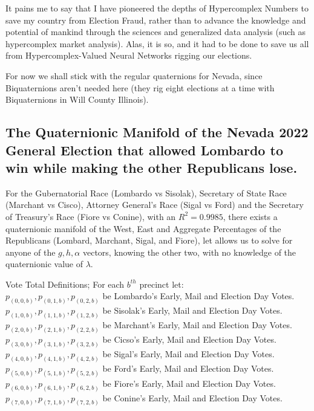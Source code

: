 It pains me to say that I have pioneered the depths of Hypercomplex Numbers to save my country from Election Fraud, rather than to advance the knowledge and potential of mankind through the sciences and generalized data analysis (such as hypercomplex market analysis). Alas, it is so, and it had to be done to save us all from Hypercomplex-Valued Neural Networks rigging our elections.

For now we shall stick with the regular quaternions for Nevada, since Biquaternions aren't needed here (they rig eight elections at a time with Biquaternions in Will County Illinois).
\newpage
\subsection{The Quaternionic Manifold of the Nevada 2022 General Election that allowed Lombardo to win while making the other Republicans lose.}

For the Gubernatorial Race (Lombardo vs Sisolak), Secretary of State Race (Marchant vs Cisco), Attorney General's Race (Sigal vs Ford) and the Secretary of Treasury's Race (Fiore vs Conine), with an $R^2=0.9985$, there exists a quaternionic manifold of the West, East and Aggregate Percentages of the Republicans (Lombard, Marchant, Sigal, and Fiore), let allows us to solve for anyone of the $g,h,\alpha$ vectors, knowing the other two, with no knowledge of the quaternionic value of $\lambda$.

Vote Total Definitions; For each $b^{th}$ precinct let:\\
$p_{(0,0,b)}, p_{(0,1,b)}, p_{(0,2,b)}$ be Lombardo's Early, Mail and Election Day Votes.\\
$p_{(1,0,b)}, p_{(1,1,b)}, p_{(1,2,b)}$ be Sisolak's Early, Mail and Election Day Votes.\\
$p_{(2,0,b)}, p_{(2,1,b)}, p_{(2,2,b)}$ be Marchant's Early, Mail and Election Day Votes.\\
$p_{(3,0,b)}, p_{(3,1,b)}, p_{(3,2,b)}$ be Cicso's Early, Mail and Election Day Votes.\\
$p_{(4,0,b)}, p_{(4,1,b)}, p_{(4,2,b)}$ be Sigal's Early, Mail and Election Day Votes.\\
$p_{(5,0,b)}, p_{(5,1,b)}, p_{(5,2,b)}$ be Ford's Early, Mail and Election Day Votes.\\
$p_{(6,0,b)}, p_{(6,1,b)}, p_{(6,2,b)}$ be Fiore's Early, Mail and Election Day Votes.\\
$p_{(7,0,b)}, p_{(7,1,b)}, p_{(7,2,b)}$ be Conine's Early, Mail and Election Day Votes.\\

